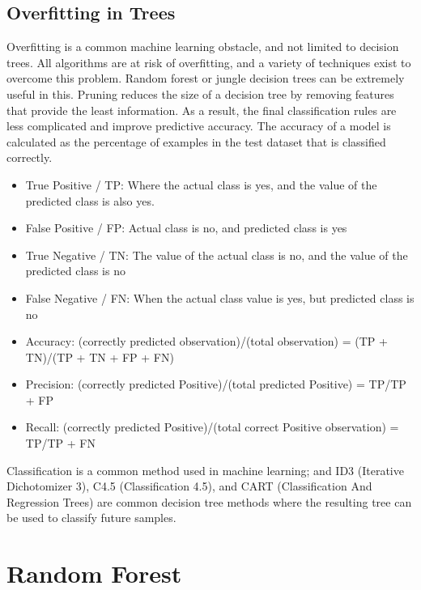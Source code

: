 \documentclass[12pt]{article}
\begin{document}
\subsection{Overfitting in Trees}
Overfitting is a common machine learning obstacle, and not limited to decision trees. All algorithms are at risk of overfitting, and a variety of techniques exist to overcome this problem. Random forest or jungle decision trees can be extremely useful in this. Pruning reduces the size of a decision tree by removing features that provide the least information. As a result, the final classification rules are
less complicated and improve predictive accuracy. The accuracy of a model is calculated as the percentage of examples in
the test dataset that is classified correctly.

\begin{itemize}

\item{True Positive / TP: Where the actual class is yes, and
the value of the predicted class is also yes.}

\item{False Positive / FP: Actual class is no, and predicted
class is yes}

\item{True Negative / TN: The value of the actual class is no,
and the value of the predicted class is no}

\item{False Negative / FN: When the actual class value is yes,
but predicted class is no}

\item{Accuracy: (correctly predicted observation)/(total
observation) = (TP + TN)/(TP + TN + FP + FN)}

\item{Precision: (correctly predicted Positive)/(total
predicted Positive) = TP/TP + FP}

\item{Recall: (correctly predicted Positive)/(total correct
Positive observation) = TP/TP + FN}

\end{itemize}

Classification is a common method used in machine learning; and
ID3 (Iterative Dichotomizer 3), C4.5 (Classification 4.5), and CART
(Classification And Regression Trees) are common decision tree methods
where the resulting tree can be used to classify future samples.
\newpage
\section{Random Forest}
\end{document}
